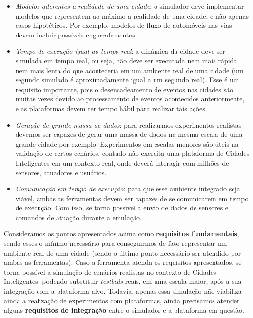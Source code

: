 \begin{itemize}
    \item \textit{Modelos aderentes a realidade de uma cidade}: o simulador deve implementar modelos que representem ao máximo a realidade de uma cidade, e não apenas casos hipotéticos.
        Por exemplo, modelos de fluxo de automóveis nas vias devem incluir possíveis engarrafamentos.

    \item \textit{Tempo de execução igual ao tempo real}: a dinâmica da cidade deve ser simulada em tempo real, ou seja, não deve ser executada nem mais rápida nem mais lenta do que aconteceria
        em um ambiente real de uma cidade (um segundo simulado é aproximadamente igual a um segundo real).
        Esse é um requisito importante, pois o desencadeamento de eventos nas cidades são muitas vezes devido ao processamento de eventos acontecidos anteriormente, e as plataformas
        devem ter tempo hábil para realizar tais ações.

    \item \textit{Geração de grande massa de dados}: para realizarmos experimentos realistas devemos ser capazes de gerar uma massa de dados na mesma escala de uma grande cidade por
        exemplo.
        Experimentos em escalas menores são úteis na validação de certos cenários, contudo não exercita uma plataforma de Cidades Inteligentes em um contexto real, onde deverá
        interagir com milhões de sensores, atuadores e usuários.

    \item \textit{Comunicação em tempo de execução}: para que esse ambiente integrado seja viável, ambas as ferramentas devem ser capazes de se comunicarem em tempo de execução.
        Com isso, se torna possível a envio de dados de sensores e comandos de atuação durante a emulação.
\end{itemize}

Consideramos os pontos apresentados acima como \textbf{requisitos fundamentais}, sendo esses o mínimo necessário para conseguirmos de fato representar um ambiente real de uma cidade (sendo o último ponto
necessário ser atendido por ambas as ferramentas).
Caso a ferramenta atenda os requisitos apresentados, se torna possível a simulação de cenários realistas no contexto de Cidades Inteligentes, podendo substituir \textit{testbeds}
reais, em uma escala maior, após a sua integração com a plataforma alvo.
Todavia, apenas essa simulação não viabiliza ainda a realização de experimentos com plataformas, ainda precisamos atender alguns \textbf{requisitos de integração} entre o simulador
e a plataforma em questão.

